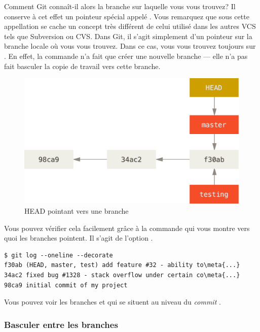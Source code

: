 Comment Git connaît-il alors la branche sur laquelle vous vous trouvez?
Il conserve à cet effet un pointeur spécial appelé .
Vous remarquez que sous cette appellation se cache un concept très différent de celui utilisé dans les autres VCS tels que Subversion ou CVS.
Dans Git, il s'agit simplement d'un pointeur sur la branche locale où vous vous trouvez.
Dans ce cas, vous vous trouvez toujours sur .
En effet, la commande  n'a fait que créer une nouvelle branche — elle n'a pas fait basculer la copie de travail vers cette branche.

\begin{figure}[H]
  \centering
  \includegraphics{images/head-to-master}
  \caption{HEAD pointant vers une branche}
  \label{fig:git:head-to-master}
\end{figure}

Vous pouvez vérifier cela facilement grâce à la commande  qui vous montre vers quoi les branches pointent. Il s'agit de l'option .
\begin{Schunk}
\begin{Verbatim}[commandchars=\\\{\}]
$ git log --oneline --decorate
f30ab (HEAD, master, test) add feature #32 - ability to\meta{...}
34ac2 fixed bug #1328 - stack overflow under certain co\meta{...}
98ca9 initial commit of my project
\end{Verbatim}
\end{Schunk}

Vous pouvez voir les branches   et  qui se situent au niveau du \emph{commit} .

\subsubsection{Basculer entre les branches}
\label{sec:git:switching_branches}

